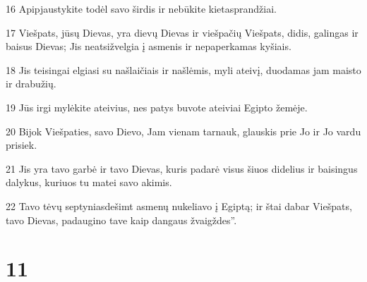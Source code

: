 \par 16 Apipjaustykite todėl savo širdis ir nebūkite kietasprandžiai. 
\par 17 Viešpats, jūsų Dievas, yra dievų Dievas ir viešpačių Viešpats, didis, galingas ir baisus Dievas; Jis neatsižvelgia į asmenis ir nepaperkamas kyšiais. 
\par 18 Jis teisingai elgiasi su našlaičiais ir našlėmis, myli ateivį, duodamas jam maisto ir drabužių. 
\par 19 Jūs irgi mylėkite ateivius, nes patys buvote ateiviai Egipto žemėje. 
\par 20 Bijok Viešpaties, savo Dievo, Jam vienam tarnauk, glauskis prie Jo ir Jo vardu prisiek. 
\par 21 Jis yra tavo garbė ir tavo Dievas, kuris padarė visus šiuos didelius ir baisingus dalykus, kuriuos tu matei savo akimis. 
\par 22 Tavo tėvų septyniasdešimt asmenų nukeliavo į Egiptą; ir štai dabar Viešpats, tavo Dievas, padaugino tave kaip dangaus žvaigždes”.



\chapter{11}


